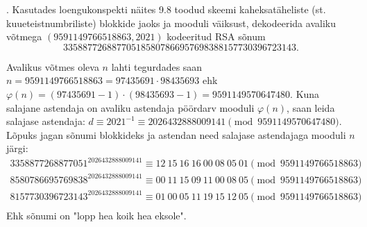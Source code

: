 \documentclass[a4paper, 10pt]{article}
\begin{document}
\bigskip

. Kasutades loengukonspekti näites 9.8 toodud skeemi kaheksatäheliste (st. kuueteist\-numbriliste) blokkide jaoks ja mooduli väiksust, dekodeerida avaliku võtmega $(9591149766518863,2021)$ kodeeritud RSA sõnum $$3358877268877051 8580786695769838 8157730396723143.$$ 

\bigskip
Avalikus võtmes oleva $n$ lahti tegurdades saan $n=9591149766518863=97435691\cdot98435693$ ehk $\varphi(n)=(97435691-1)\cdot(98435693-1)=9591149570647480$. Kuna salajane astendaja on avaliku astendaja pöördarv mooduli $\varphi(n)$, saan leida salajase astendaja: $d\equiv2021^{-1}\equiv2026432888009141\pmod{9591149570647480}$. Lõpuks jagan sõnumi blokkideks ja astendan need salajase astendajaga mooduli $n$ järgi:
\begin{gather*}
3358877268877051^{2026432888009141}\equiv12\ 15\ 16\ 16\ 00\ 08\ 05\ 01\pmod{9591149766518863}\\
8580786695769838^{2026432888009141}\equiv00\ 11\ 15\ 09\ 11\ 00\ 08\ 05\pmod{9591149766518863}\\
8157730396723143^{2026432888009141}\equiv01\ 00\ 05\ 11\ 19\ 15\ 12\ 05\pmod{9591149766518863}\\
\end{gather*}
Ehk sõnumi on "lopp hea koik hea eksole".
\bigskip
\end{document}
